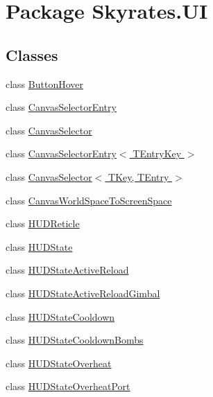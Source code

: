 \hypertarget{namespace_skyrates_1_1_u_i}{\section{Package Skyrates.\-U\-I}
\label{namespace_skyrates_1_1_u_i}
}
\subsection*{Classes}
\begin{DoxyCompactItemize}
\item 
class \hyperlink{class_skyrates_1_1_u_i_1_1_button_hover}{Button\-Hover}
\item 
class \hyperlink{class_skyrates_1_1_u_i_1_1_canvas_selector_entry}{Canvas\-Selector\-Entry}
\item 
class \hyperlink{class_skyrates_1_1_u_i_1_1_canvas_selector}{Canvas\-Selector}
\item 
class \hyperlink{class_skyrates_1_1_u_i_1_1_canvas_selector_entry_3_01_t_entry_key_01_4}{Canvas\-Selector\-Entry$<$ T\-Entry\-Key $>$}
\item 
class \hyperlink{class_skyrates_1_1_u_i_1_1_canvas_selector_3_01_t_key_00_01_t_entry_01_4}{Canvas\-Selector$<$ T\-Key, T\-Entry $>$}
\item 
class \hyperlink{class_skyrates_1_1_u_i_1_1_canvas_world_space_to_screen_space}{Canvas\-World\-Space\-To\-Screen\-Space}
\item 
class \hyperlink{class_skyrates_1_1_u_i_1_1_h_u_d_reticle}{H\-U\-D\-Reticle}
\item 
class \hyperlink{class_skyrates_1_1_u_i_1_1_h_u_d_state}{H\-U\-D\-State}
\item 
class \hyperlink{class_skyrates_1_1_u_i_1_1_h_u_d_state_active_reload}{H\-U\-D\-State\-Active\-Reload}
\item 
class \hyperlink{class_skyrates_1_1_u_i_1_1_h_u_d_state_active_reload_gimbal}{H\-U\-D\-State\-Active\-Reload\-Gimbal}
\item 
class \hyperlink{class_skyrates_1_1_u_i_1_1_h_u_d_state_cooldown}{H\-U\-D\-State\-Cooldown}
\item 
class \hyperlink{class_skyrates_1_1_u_i_1_1_h_u_d_state_cooldown_bombs}{H\-U\-D\-State\-Cooldown\-Bombs}
\item 
class \hyperlink{class_skyrates_1_1_u_i_1_1_h_u_d_state_overheat}{H\-U\-D\-State\-Overheat}
\item 
class \hyperlink{class_skyrates_1_1_u_i_1_1_h_u_d_state_overheat_port}{H\-U\-D\-State\-Overheat\-Port}

\end{DoxyCompactItemize}
